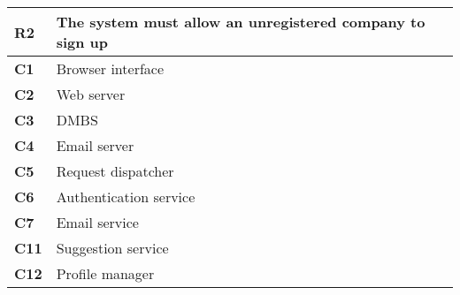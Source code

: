 \begin{table}[H]
    \centering
    \begin{tabular}{|l|m{10cm}|}
        \hline \textbf{R2} & The system must allow an unregistered company to sign up \\
        \hline \textbf{C1} & Browser interface \\
        \hline \textbf{C2} & Web server \\
        \hline \textbf{C3} & DMBS \\
        \hline \textbf{C4} & Email server \\
        \hline \textbf{C5} & Request dispatcher \\
        \hline \textbf{C6} & Authentication service \\
        \hline \textbf{C7} & Email service \\
        \hline \textbf{C11} & Suggestion service \\
        \hline \textbf{C12} & Profile manager \\
        \hline
    \end{tabular}
\end{table}

